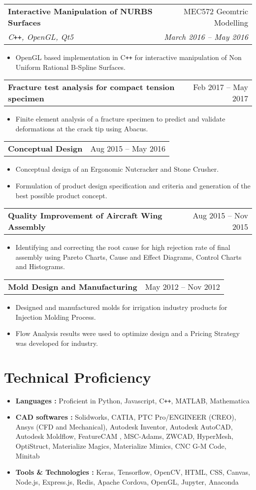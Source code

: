\documentclass[letterpaper,10pt]{article}
\makeatletter
\newcommand{\resumeHeading}[4]{
  \vspace{-1pt}
    \begin{tabular*}{0.97\textwidth}{l@{\extracolsep{\fill}}r}
      \textbf{#1} & #2 \vspace{-2pt}\\ \vspace{1pt}
      \textit{\small#3} & \textit{\small #4} \\
    \end{tabular*}
}
\newcommand{\resumeHeadingwithDate}[2]{
	\vspace{-1pt}
	\begin{tabular*}{0.97\textwidth}{l@{\extracolsep{\fill}}r}
		\textbf{#1} & #2 \vspace{-2pt}\\
	\end{tabular*}
	\vspace{+2pt}
}
\newcommand{\resumeSection}[1]{
\vspace{-12pt}
\section{\textbf{#1}}
}
\newcommand{\resumeItemListStart}{
\vspace{-7pt}
\begin{itemize}[leftmargin=14pt]
}
\newcommand{\resumeItemListEnd}{
\vspace{+7pt}
\end{itemize}
}
\newcommand{\resumeItem}[1]{
  \item\small{
      {#1 \vspace{-7pt}
      }
  }
}
\makeatother
\begin{document}
	\vspace{-2pt}
	\resumeHeading{Interactive Manipulation of NURBS Surfaces}{MEC572 Geomtric Modelling}{C\texttt{++}, OpenGL, Qt5}{March 2016 -- May 2016}
	\resumeItemListStart
	\resumeItem{OpenGL based implementation in C\texttt{++} for interactive manipulation of Non Uniform Rational B-Spline Surfaces.}
	\resumeItemListEnd
	
	\resumeHeadingwithDate{Fracture test analysis for compact tension specimen}{Feb 2017 -- May 2017}
	\resumeItemListStart
	\resumeItem{Finite element analysis of a fracture specimen to predict and validate deformations at the crack tip using Abacus.}
	\resumeItemListEnd
	
	\vspace{-4pt}
	\resumeHeadingwithDate{Conceptual Design}{Aug 2015 -- May 2016}
	\resumeItemListStart
	\resumeItem{Conceptual design of an Ergonomic Nutcracker and Stone Crusher.}
	\resumeItem{Formulation of product design specification and criteria and generation of the best possible product concept.}
	\resumeItemListEnd
	
	\vspace{-4pt}
	\resumeHeadingwithDate{Quality Improvement of Aircraft Wing Assembly}{Aug 2015 -- Nov 2015}
	\resumeItemListStart
	\resumeItem{Identifying and correcting the root cause for high rejection rate of final assembly using Pareto Charts, Cause and Effect Diagrams, Control Charts and Histograms.}
	\resumeItemListEnd
	
	\vspace{-4pt}
	\resumeHeadingwithDate{Mold Design and Manufacturing}{May 2012 -- Nov 2012}
	\resumeItemListStart
	\resumeItem{Designed and manufactured molds for irrigation industry products for Injection Molding Process.}
	\resumeItem{Flow Analysis results were used to optimize design and a Pricing Strategy was developed for industry.}
	\resumeItemListEnd
    
    
    
\resumeSection{Technical Proficiency}
    \vspace{+7pt}
    \resumeItemListStart
    \resumeItem{\textbf{Languages :} Proficient in Python, Javascript, C\texttt{++}, MATLAB, Mathematica}
    \resumeItem{\textbf{CAD softwares :} Solidworks, CATIA, PTC Pro/ENGINEER (CREO), Ansys (CFD and Mechanical), Autodesk Inventor, Autodesk AutoCAD, Autodesk Moldflow, FeatureCAM , MSC-Adams, ZWCAD, HyperMesh, OptiStruct, Materialize Magics, Materialize Mimics, CNC G-M Code, Minitab}
    \resumeItem{\textbf{Tools \& Technologies :} Keras, Tensorflow, OpenCV, HTML, CSS, Canvas, Node.js, Express.js, Redis, Apache Cordova, OpenGL, Jupyter, Anaconda}
    \resumeItemListEnd
    
\end{document}
